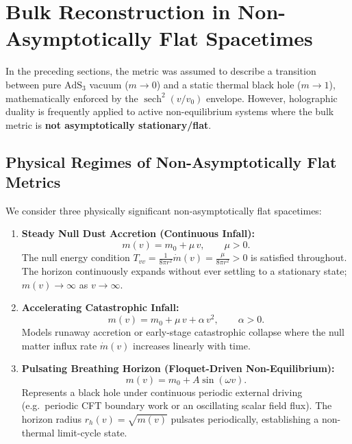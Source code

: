 \documentclass[11pt,a4paper]{article}
\begin{document}
\section{Bulk Reconstruction in Non-Asymptotically Flat Spacetimes}

In the preceding sections, the metric was assumed to describe a transition between pure $\mathrm{AdS}_3$ vacuum ($m \to 0$) and a static thermal black hole ($m \to 1$), mathematically enforced by the $\operatorname{sech}^2(v/v_0)$ envelope. However, holographic duality is frequently applied to active non-equilibrium systems where the bulk metric is \textbf{not asymptotically stationary/flat}.

\subsection{Physical Regimes of Non-Asymptotically Flat Metrics}
We consider three physically significant non-asymptotically flat spacetimes:
\begin{enumerate}
    \item \textbf{Steady Null Dust Accretion (Continuous Infall):}
    \begin{equation}
        m(v) = m_0 + \mu\, v, \qquad \mu > 0.
        \label{eq:linear_accretion}
    \end{equation}
    The null energy condition $T_{vv} = \frac{1}{8\pi r^2} \dot{m}(v) = \frac{\mu}{8\pi r^2} > 0$ is satisfied throughout. The horizon continuously expands without ever settling to a stationary state; $m(v) \to \infty$ as $v \to \infty$.
    
    \item \textbf{Accelerating Catastrophic Infall:}
    \begin{equation}
        m(v) = m_0 + \mu\, v + \alpha\, v^2, \qquad \alpha > 0.
        \label{eq:quadratic_infall}
    \end{equation}
    Models runaway accretion or early-stage catastrophic collapse where the null matter influx rate $\dot{m}(v)$ increases linearly with time.
    
    \item \textbf{Pulsating Breathing Horizon (Floquet-Driven Non-Equilibrium):}
    \begin{equation}
        m(v) = m_0 + A \sin(\omega v).
        \label{eq:breathing_horizon}
    \end{equation}
    Represents a black hole under continuous periodic external driving (e.g.\ periodic CFT boundary work or an oscillating scalar field flux). The horizon radius $r_h(v) = \sqrt{m(v)}$ pulsates periodically, establishing a non-thermal limit-cycle state.
\end{enumerate}
\end{document}
